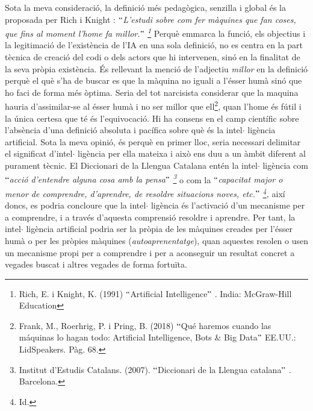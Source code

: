 \documentclass[12pt]{article}
\begin{document}
\vspace{\baselineskip}
\begin{justify}
Sota la meva consideració, la definició més pedagògica, senzilla i global és la proposada per Rich i Knight : $``$\textit{L’estudi sobre com fer màquines que fan coses, que fins al moment l’home fa millor.$"$ \footnote{ Rich, E. i Knight, K. (1991) $``$Artificial Intelligence$"$ . India: McGraw-Hill Education } }Perquè emmarca la funció, els objectius i la legitimació de l’existència de l’IA en una sola definició, no es centra en la part tècnica de creació del codi o dels actors que hi intervenen, sinó en la finalitat de la seva pròpia existència. És rellevant la menció de l’adjectiu \textit{millor }en la definició perquè el què s’ha de buscar es que la màquina no iguali a l’ésser humà sinó que ho faci de forma més òptima. Seria del tot narcisista considerar que la maquina hauria d’assimilar-se al ésser humà i no ser millor que ell\footnote{ Frank, M., Roerhrig, P. i Pring, B. (2018) $``$Qué haremos cuando las máquinas lo hagan todo: Artificial Intelligence, Bots $\&$  Big Data$"$  EE.UU.: LidSpeakers. Pàg. 68.  }, quan l’home és fútil i la única certesa que té és l’equivocació.  Hi ha consens en el camp científic sobre l’absència d’una definició absoluta i pacífica sobre què és la intel$ \cdot $ ligència artificial. Sota la meva opinió, és perquè en primer lloc, seria necessari delimitar el significat d’intel$ \cdot $ ligència per ella mateixa i això ens duu a un àmbit diferent al purament tècnic. El Diccionari de la Llengua Catalana entén la intel$ \cdot $ ligència com $``$\textit{acció d’entendre alguna cosa amb la pensa$"$ \footnote{ Institut d’Estudis Catalans. (2007). $``$Diccionari de la Llengua catalana$"$ . Barcelona. } }o com la \textit{$``$capacitat major o menor de comprendre, d’aprendre, de resoldre situacions noves, etc.$"$ \footnote{ Id.  }, }així doncs, es podria concloure que la intel$ \cdot $ ligència és l’activació d’un mecanisme per a comprendre, i a través d’aquesta comprensió resoldre i aprendre. Per tant, la intel$ \cdot $ ligència artificial podria ser la pròpia de les màquines creades per l’ésser humà o per les pròpies màquines (\textit{autoaprenentatge}), quan aquestes resolen o usen un mecanisme propi per a comprendre i per a aconseguir un resultat concret a vegades buscat i altres vegades de forma fortuïta.
\end{justify}\par
\end{document}

